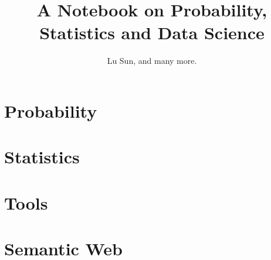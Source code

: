


\makeindex



\frontmatter

\title{A Notebook on Probability, Statistics and Data Science}
\author{Lu Sun, and many more.}

\maketitle


\tableofcontents


\listoffigures
\listoftables

\mainmatter

\part{Probability}







\part{Statistics}







\part{Tools}









\part{Semantic Web}










\printindex


